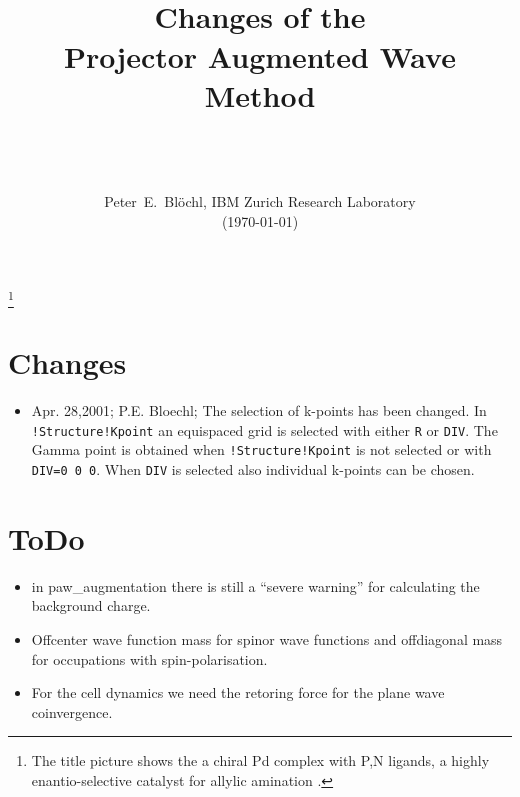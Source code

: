\documentclass[final,12pt]{article}
\title{{\bfseries\Huge 
    \hrulefill\\
    \hrulefill Changes of the \hrulefill\\
    \hrulefill \hrulefill Projector Augmented Wave \hrulefill\\
    \hrulefill Method \hrulefill\\}
    \medskip{\LARGE Version 2.0}\\
\resizebox{!}{9.0cm}{\texttt{[image: big.eps]}}
}
\date{\hrulefill\\Peter~E.~Bl\"ochl, IBM Zurich Research Laboratory\\(\today)}
\begin{document}
          
\maketitle   
%
\noindent            
\setcounter{page}{1}
\footnote{The title picture shows the a chiral Pd complex with P,N ligands,
  a highly enantio-selective catalyst for allylic amination \cite{Pdcat}.}
\newpage
\tableofcontents
\newpage
\setcounter{page}{1}
\section{Changes}
\begin{itemize}
\item Apr. 28,2001; P.E. Bloechl; The selection of k-points has been
changed.  In \texttt{!Structure!Kpoint} an equispaced grid is selected
with either \texttt{R} or \texttt{DIV}. The Gamma point is obtained
when \texttt{!Structure!Kpoint} is not selected or with \texttt{DIV=0 0
0}. When \texttt{DIV} is selected also individual k-points can be
chosen.
\end{itemize}
\section{ToDo}
\begin{itemize}
\item in paw\_augmentation there is still a ``severe warning'' for
calculating the background charge. 
\item Offcenter wave function mass for spinor wave functions and
offdiagonal mass for occupations with spin-polarisation.
\item For the cell dynamics we need the retoring force for the plane
wave coinvergence.
\end{itemize}
\end{document}
